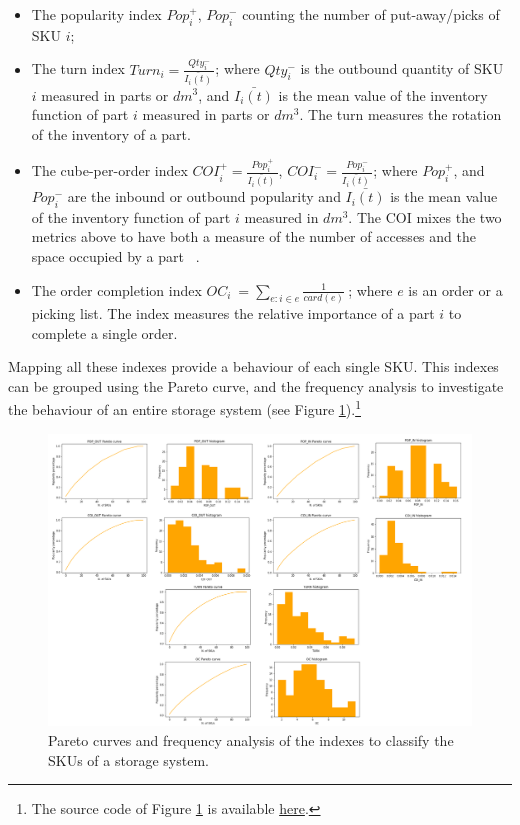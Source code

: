 \begin{itemize}
    \item The popularity index $Pop_i^+$, $Pop_i^-$ counting the number of put-away/picks of SKU $i$;
    \item The turn index $Turn_i=\frac{Qty_i^-}{\bar{I_i\left(t\right)}\ }$; where $Qty_i^-$ is the outbound quantity of SKU $i$ measured in parts or $dm^3$, and $\bar{I_i\left(t\right)}$ is the mean value of the inventory function of part $i$ measured in parts or $dm^3$. The turn measures the rotation of the inventory of a part.
    \item 	The cube-per-order index $COI_i^+=\frac{Pop_i^+}{\bar{I_i\left(t\right)}\ }$, $COI_i^-=\frac{Pop_i^-}{\bar{I_i\left(t\right)}\ }$; where $Pop_i^+$, and $Pop_i^-$ are the inbound or outbound popularity and $\bar{I_i\left(t\right)}$ is the mean value of the inventory function of part $i$ measured in $dm^3$. The COI mixes the two metrics above to have both a measure of the number of accesses and the space occupied by a part ~\cite{Haskett1963, Malmborg1990}.
    \item 	The order completion index $OC_i\ =\sum_{e:i\in e}\frac{1}{card(e)}\ $; where $e$ is an order or a  picking list. The index measures the relative importance of a part $i$ to complete a single order.
\end{itemize}

Mapping all these indexes provide a behaviour of each single SKU. This indexes can be grouped using the Pareto curve, and the frequency analysis to investigate the behaviour of an entire storage system (see Figure \ref{fig_wh_profile}).\footnote{The source code of Figure \ref{fig_wh_profile} is available \href{https://github.com/aletuf93/logproj/blob/master/examples/WH_02\%20Warehouse\%20indexes\%20assessment.ipynb}{here}.
}

\begin{figure}[hbt!]
\centering
\includegraphics[width=1.0\textwidth]{SectionWarehouses/control_figures/fig_wh_profile.png}
\captionsetup{type=figure}
\caption{Pareto curves and frequency analysis of the indexes to classify the SKUs of a storage system.}
\label{fig_wh_profile}
\end{figure}

